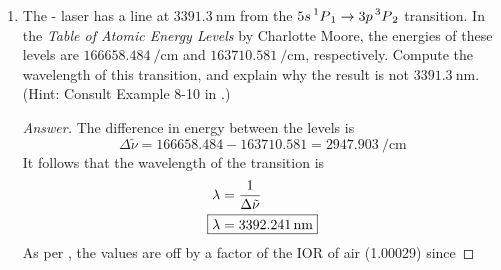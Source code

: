 \documentclass[../psets.tex]{subfiles}
\begin{document}
\begin{enumerate}
    \begin{proof}[Answer]
        The ground state as a singly degenerate $s$ orbital and the excited state as a triply degenerate $p$ orbital have degeneracies
        \begin{align*}
            g_1 &= 1&
            g_2 &= 3
        \end{align*}
        The wavelength of light absorbed in the transition is
        \begin{equation*}
            \lambda = \frac{c}{\nu} = \SI{1.218e-7}{\meter}
        \end{equation*}
        The radiative lifetime is
        \begin{equation*}
            \tau_R = \frac{1}{A} = \SI{1.6e-9}{\second}
        \end{equation*}
        Therefore, the transition dipole moment is
        \begin{align*}
            |\mu| &= \sqrt{\frac{3\epsilon_0hc^3g_2A}{16\pi^3\nu^3g_1}}\\
            \Aboxed{|\mu| &= \SI{1.1e-29}{\coulomb\meter}}
        \end{align*}
    \end{proof}
    \item The - laser has a line at $\SI{3391.3}{\nano\meter}$ from the $5s\prescript{1}{}{P}_1\to 3p\prescript{3}{}{P}_2$ transition. In the \emph{Table of Atomic Energy Levels} by Charlotte Moore, the energies of these levels are $\SI{166658.484}{\per\centi\meter}$ and $\SI{163710.581}{\per\centi\meter}$, respectively. Compute the wavelength of this transition, and explain why the result is not $\SI{3391.3}{\nano\meter}$. (Hint: Consult Example 8-10 in \textcite{bib:McQuarrieSimon}.)
    \begin{proof}[Answer]
        The difference in energy between the levels is
        \begin{equation*}
            \Delta\tilde{\nu} = 166658.484-163710.581 = \SI{2947.903}{\per\centi\meter}
        \end{equation*}
        It follows that the wavelength of the transition is
        \begin{align*}
            \lambda &= \frac{1}{\Delta\tilde{\nu}}\\
            \Aboxed{\lambda &= \SI{3392.241}{\nano\meter}}
        \end{align*}
        As per \textcite{bib:McQuarrieSimon}, the values are off by a factor of the IOR of air (1.00029) since 

\end{proof}
\end{enumerate}
\end{document}
